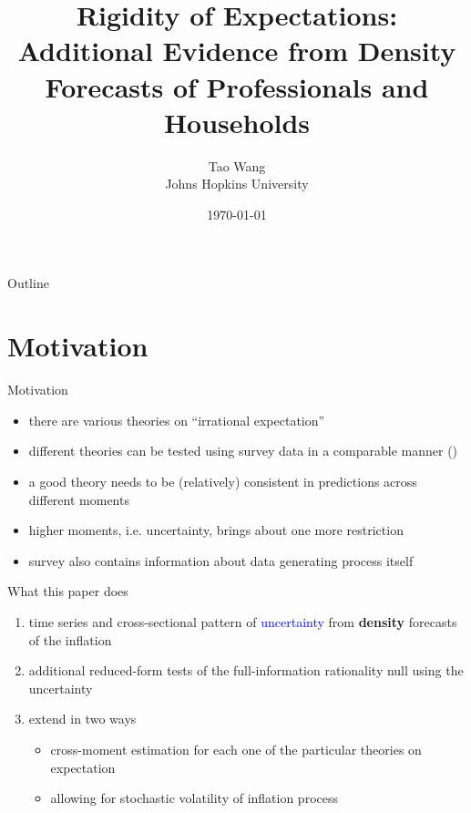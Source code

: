 \documentclass{beamer}
\title{Rigidity of Expectations: Additional Evidence from Density Forecasts of Professionals and Households}
\author{Tao Wang \\ Johns Hopkins University}
\date{\today}
\begin{document}
	

\begin{frame}
	\titlepage
\end{frame}
\begin{frame}{Outline}
	\tableofcontents
\end{frame}


\section{Motivation}

\begin{frame}{Motivation}
	\begin{itemize}
		\item there are various theories on  ``irrational expectation''
		\item different theories can be tested using survey data  in a comparable manner  (\citet{coibion2012can})
		\item a good theory needs to be (relatively) consistent in predictions across different moments
		\item higher moments, i.e. uncertainty, brings about one more restriction
		\item survey also contains information about data generating process itself
	\end{itemize}
\end{frame}


\begin{frame}{What this paper does}
	\begin{enumerate}
		\item time series and cross-sectional pattern of \textcolor{blue}{uncertainty} from \textbf{density} forecasts of the inflation 
		\item additional reduced-form tests of the full-information rationality null using the uncertainty 
		\item extend \citet{coibion2012can} in two ways 
		\begin{itemize}
		\item cross-moment estimation for each one of the particular theories on expectation 
		\item allowing for stochastic volatility of inflation process 
		\end{itemize}
	\end{enumerate}
\end{frame}
\end{document}
